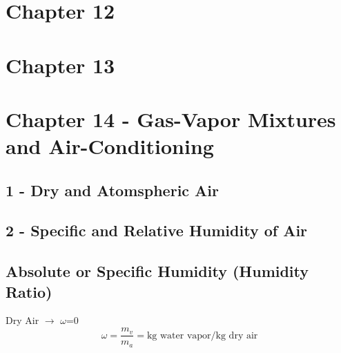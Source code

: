 \documentclass[10pt,landscape]{article}
\begin{document}
\begin{multicols}{3}

\section{Chapter 12}

\section{Chapter 13}

\section{Chapter 14 - Gas-Vapor Mixtures and Air-Conditioning}
\subsection{1 - Dry and Atomspheric Air}
\subsection{2 - Specific and Relative Humidity of Air}
\subsection{Absolute or Specific Humidity (Humidity Ratio)}
Dry Air $\rightarrow$ $\omega$=0
\begin{equation}
    \omega=\frac{m_v}{m_a}=\text{kg water vapor/kg dry air}
\end{equation}

\end{multicols}
\end{document}
